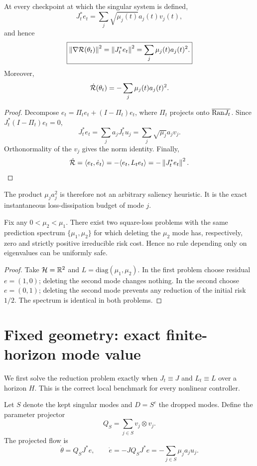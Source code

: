 \begin{theorem}\label{thm:grad-energy}
At every checkpoint at which the singular system is defined,
\[
J_t^\ast e_t=\sum_j\sqrt{\mu_j(t)}a_j(t)v_j(t),
\]
and hence
\[
\boxed{
\left\lVert \nabla \mathcal R(\theta_t)\right\rVert^2
=\left\lVert J_t^\ast e_t\right\rVert^2
=\sum_j\mu_j(t)a_j(t)^2.}
\]
Moreover,
\[
\dot{\mathcal R}(\theta_t)=-\sum_j\mu_j(t)a_j(t)^2.
\]
\end{theorem}

\begin{proof}
Decompose $e_t=\Pi_te_t+(I-\Pi_t)e_t$, where $\Pi_t$ projects onto $\overline{\mathrm{Ran} J_t}$. Since $J_t^\ast(I-\Pi_t)e_t=0$,
\[
J_t^\ast e_t=\sum_j a_jJ_t^\ast u_j
=\sum_j\sqrt{\mu_j}a_jv_j.
\]
Orthonormality of the $v_j$ gives the norm identity. Finally,
\[
\dot{\mathcal R}=\langle e_t,\dot e_t\rangle
=-\langle e_t,L_te_t\rangle
=-\left\lVert J_t^\ast e_t\right\rVert^2.
\]
\end{proof}

The product $\mu_j a_j^2$ is therefore not an arbitrary saliency heuristic. It is the exact instantaneous loss-dissipation budget of mode $j$.

\begin{proposition}\label{prop:no-eigen-only}
Fix any $0<\mu_2<\mu_1$. There exist two square-loss problems with the same prediction spectrum $\{\mu_1,\mu_2\}$ for which deleting the $\mu_2$ mode has, respectively, zero and strictly positive irreducible risk cost. Hence no rule depending only on eigenvalues can be uniformly safe.
\end{proposition}

\begin{proof}
Take $\mathcal H=\mathbb R^2$ and $L=\mathrm{diag}(\mu_1,\mu_2)$. In the first problem choose residual $e=(1,0)$; deleting the second mode changes nothing. In the second choose $e=(0,1)$; deleting the second mode prevents any reduction of the initial risk $1/2$. The spectrum is identical in both problems.
\end{proof}

\section{Fixed geometry: exact finite-horizon mode value}
We first solve the reduction problem exactly when $J_t\equiv J$ and $L_t\equiv L$ over a horizon $H$. This is the correct local benchmark for every nonlinear controller.

Let $S$ denote the kept singular modes and $D=S^c$ the dropped modes. Define the parameter projector
\[
Q_S=\sum_{j\in S}v_j\otimes v_j.
\]
The projected flow is
\[
\dot\theta=Q_SJ^\ast e,
\qquad
\dot e=-JQ_SJ^\ast e
=-\sum_{j\in S}\mu_j a_j u_j.
\]

